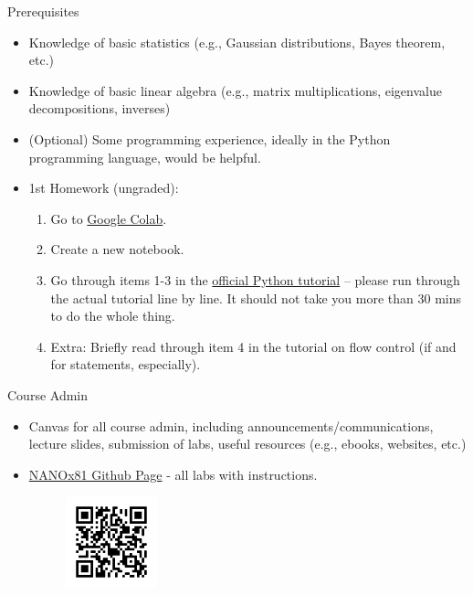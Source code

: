 \documentclass[aspectratio=169]{beamer}
\begin{document}
\begin{frame}{Prerequisites}
    \begin{itemize}
        \item Knowledge of basic statistics (e.g., Gaussian distributions, Bayes theorem, etc.)
        \item Knowledge of basic linear algebra (e.g., matrix multiplications, eigenvalue decompositions, inverses)
        \item (Optional) Some programming experience, ideally in the Python programming language, would be helpful.
        \item 1st Homework (ungraded):
        \begin{enumerate}
            \item Go to \href{https://colab.research.google.com/}{Google Colab}.
            \item Create a new notebook.
            \item Go through items 1-3 in the \href{http://docs.python.org/3/tutorial/}{official Python tutorial} – please run through the actual tutorial line by line. It should not take you more than 30 mins to do the whole thing.
            \item Extra: Briefly read through item 4 in the tutorial on flow control (if and for statements, especially).
        \end{enumerate}
    \end{itemize}
\end{frame}

\begin{frame}{Course Admin}
    \begin{itemize}
        \item Canvas for all course admin, including announcements/communications, lecture slides, submission of labs, useful resources (e.g., ebooks, websites, etc.)
        \item \href{https://github.com/materialsvirtuallab/nano281}{NANOx81 Github Page} - all labs with instructions.
        \begin{figure}
            \centering
            \includegraphics[width=0.25\textwidth]{lectures/slides_tex/QR-NANO281Github.png}
            \label{fig:my_label}
        \end{figure}
    \end{itemize}
\end{frame}
\end{document}
